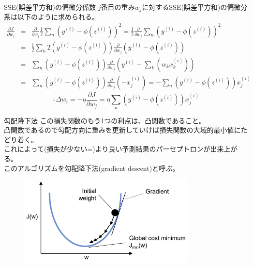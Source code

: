 \documentclass[aspectratio=169, dvipdfmx, 11pt]{beamer} %
\begin{document}
\begin{frame}{SSE(誤差平方和)の偏微分係数}
    \(j\)番目の重み\(w_j\)に対するSSE(誤差平方和)の偏微分系は以下のように求められる。
    \begin{eqnarray*}
        \frac{\partial J}{\partial w_j} &=& \frac{\partial}{\partial w_j} \frac{1}{2} \sum_{n}^{}(y^{(i)}-\phi(z^{(i)}))^2
        = \frac{1}{2} \frac{\partial}{\partial w_j} \sum_{n}^{}(y^{(i)}-\phi(z^{(i)}))^2 \\
        &=& \frac{1}{2} \sum_{n}^{}2(y^{(i)}-\phi(z^{(i)})) \frac{\partial}{\partial w_j} (y^{(i)}-\phi(z^{(i)})) \\
        &=& \sum_{n}^{}(y^{(i)}-\phi(z^{(i)})) \frac{\partial}{\partial w_j} (y^{(i)}-\sum_{k}^{}(w_kx_{k}^{(i)})) \\
        &=& \sum_{n}^{}(y^{(i)}-\phi(z^{(i)})) \frac{\partial}{\partial w_j} (-x_{j}^{(i)})
        = -\sum_{n}^{}(y^{(i)}-\phi(z^{(i)})) x_{j}^{(i)}
    \end{eqnarray*}
    \begin{equation*}
        \therefore \Delta w_i = - \eta \frac{\partial J}{\partial w_j} = \eta \sum_{n}^{}(y^{(i)}-\phi(z^{(i)})) x_{j}^{(i)}
    \end{equation*}

\end{frame}

\begin{frame}{勾配降下法}
    この損失関数のもう1つの利点は、凸関数であること。\\
    凸関数であるので勾配方向に重みを更新していけば損失関数の大域的最小値にたどり着く。\\
    これによって(損失が少ない=)より良い予測結果のパーセプトロンが出来上がる。 \\
    このアルゴリズムを勾配降下法(gradient descent)と呼ぶ。 \\
    \begin{figure}[b]
        \begin{center}
        \includegraphics[width=90mm]{img/day01/fig09.png}
        \end{center}
    \end{figure}
\end{frame}
\end{document}
